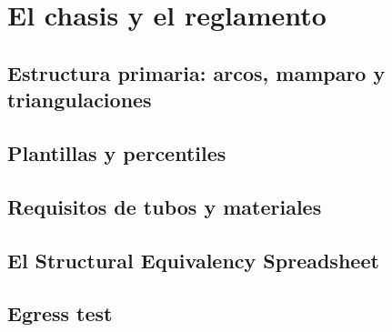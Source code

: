 \chapter{El chasis y el reglamento}
\label{ch:chasis_reglamento}

\begin{objetivos}
  \item {}
  \item {}
  \item {}
\end{objetivos}


\section{Estructura primaria: arcos, mamparo y triangulaciones}
\label{sec:chasis_reglamento:01}

\section{Plantillas y percentiles}
\label{sec:chasis_reglamento:02}

\section{Requisitos de tubos y materiales}
\label{sec:chasis_reglamento:03}

\section{El Structural Equivalency Spreadsheet}
\label{sec:chasis_reglamento:04}

\section{Egress test}
\label{sec:chasis_reglamento:05}


